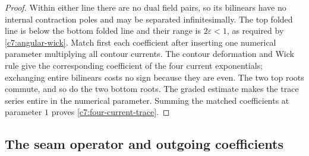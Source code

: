 \begin{proof}
Within either line there are no dual field pairs, so its bilinears have no internal contraction poles and may be separated infinitesimally. The top folded line is below the bottom folded line and their range is $2\varepsilon<1$, as required by \eqref{c7:angular-wick}. Match first each coefficient after inserting one numerical parameter multiplying all contour currents. The contour deformation and Wick rule give the corresponding coefficient of the four current exponentials; exchanging entire bilinears costs no sign because they are even. The two top roots commute, and so do the two bottom roots. The graded estimate makes the trace series entire in the numerical parameter. Summing the matched coefficients at parameter $1$ proves \eqref{c7:four-current-trace}.
\end{proof}

\subsection{The seam operator and outgoing coefficients}

